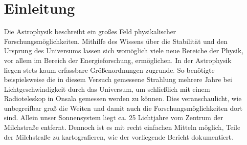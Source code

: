 \section{Einleitung}
Die Astrophysik beschreibt ein großes Feld physikalischer Forschungsmöglichkeiten. Mithilfe des Wissens über die Stabilität und den Ursprung des Universums lassen sich womöglich viele neue Bereiche der Physik, vor allem im Bereich der Energieforschung, ermöglichen.
In der Astrophysik liegen stets kaum erfassbare Größenordnungen zugrunde.
So benötigte beispielsweise die in diesem Versuch gemessene Strahlung mehrere Jahre bei Lichtgeschwindigkeit durch das Universum, um schließlich mit einem Radioteleskop in Onsala gemessen werden zu können.
Dies veranschaulicht, wie unbegreifbar groß die Weiten und damit auch die Forschungsmöglichkeiten dort sind.
Allein unser Sonnensystem liegt ca. 25 Lichtjahre vom Zentrum der Milchstraße entfernt.
Dennoch ist es mit recht einfachen Mitteln möglich, Teile der Milchstraße zu kartografieren, wie der vorliegende Bericht dokumentiert.
\newline